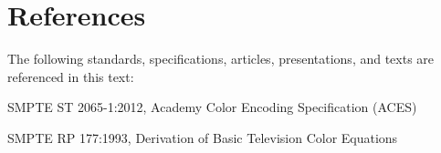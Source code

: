 \numberedformat
\chapter{References}
The following standards, specifications, articles, presentations, and texts are referenced in this text:

SMPTE ST 2065-1:2012, Academy Color Encoding Specification (ACES)

SMPTE RP 177:1993, Derivation of Basic Television Color Equations